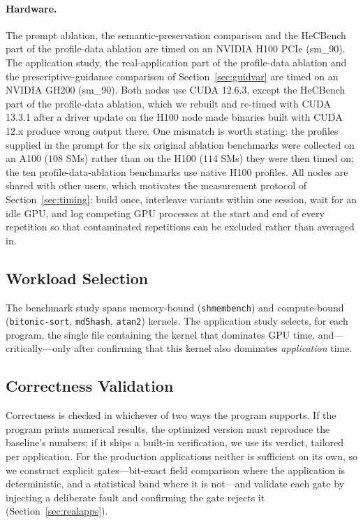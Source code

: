 \paragraph{Hardware.}
The prompt ablation, the semantic-preservation comparison and the HeCBench part of the profile-data
ablation are timed on an NVIDIA H100 PCIe (sm\_90). The application study, the real-application part
of the profile-data ablation and the prescriptive-guidance comparison of Section~\ref{sec:guidvar}
are timed on an NVIDIA GH200 (sm\_90). Both nodes use CUDA 12.6.3, except the HeCBench part of the
profile-data ablation, which we rebuilt and re-timed with CUDA 13.3.1 after a driver update on the
H100 node made binaries built with CUDA 12.x produce wrong output there. One
mismatch is worth stating: the profiles supplied in the prompt for the six original ablation benchmarks
were collected on an A100 ($108$ SMs) rather than on the H100 ($114$ SMs) they were then timed on; the
ten profile-data-ablation benchmarks use native H100 profiles. All nodes are shared with other
users, which motivates the measurement protocol of Section~\ref{sec:timing}: build once, interleave
variants within one session, wait for an idle GPU, and log competing GPU processes at the start and end
of every repetition so that contaminated repetitions can be excluded rather than averaged in.

\subsection{Workload Selection}
The benchmark study spans memory-bound (\texttt{shmembench}) and compute-bound (\texttt{bitonic-sort},
\texttt{md5hash}, \texttt{atan2}) kernels. The application study selects, for each program, the single
file containing the kernel that dominates GPU time, and---critically---only after confirming that this
kernel also dominates \emph{application} time.

\subsection{Correctness Validation}
Correctness is checked in whichever of two ways the program supports. If the program prints numerical
results, the optimized version must reproduce the baseline's numbers; if it ships a built-in
verification, we use its verdict, tailored per application. For the production applications neither is
sufficient on its own, so we construct explicit gates---bit-exact field comparison where the
application is deterministic, and a statistical band where it is not---and validate each gate by
injecting a deliberate fault and confirming the gate rejects it (Section~\ref{sec:realapps}).

